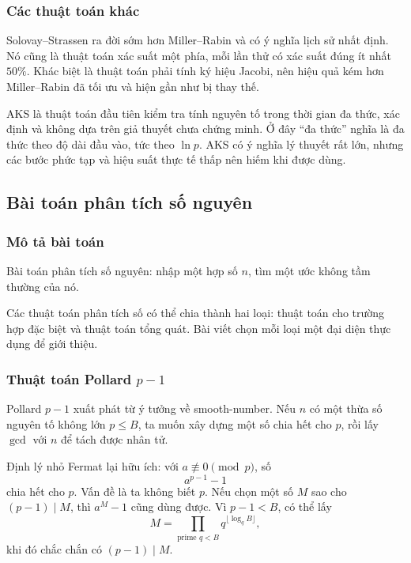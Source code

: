 \documentclass[11pt]{article}
\begin{document}
\subsubsection{Các thuật toán khác}

Solovay--Strassen ra đời sớm hơn Miller--Rabin và có ý nghĩa lịch sử nhất
định. Nó cũng là thuật toán xác suất một phía, mỗi lần thử có xác suất đúng ít
nhất \(50\%\). Khác biệt là thuật toán phải tính ký hiệu Jacobi, nên hiệu quả
kém hơn Miller--Rabin đã tối ưu và hiện gần như bị thay thế.

AKS là thuật toán đầu tiên kiểm tra tính nguyên tố trong thời gian đa thức, xác
định và không dựa trên giả thuyết chưa chứng minh. Ở đây ``đa thức'' nghĩa là
đa thức theo độ dài đầu vào, tức theo \(\ln p\). AKS có ý nghĩa lý thuyết rất
lớn, nhưng các bước phức tạp và hiệu suất thực tế thấp nên hiếm khi được dùng.

\subsection{Bài toán phân tích số nguyên}

\subsubsection{Mô tả bài toán}

Bài toán phân tích số nguyên: nhập một hợp số \(n\), tìm một ước không tầm
thường của nó.

Các thuật toán phân tích số có thể chia thành hai loại: thuật toán cho trường
hợp đặc biệt và thuật toán tổng quát. Bài viết chọn mỗi loại một đại diện thực
dụng để giới thiệu.

\subsubsection{\texorpdfstring{Thuật toán Pollard \(p-1\)}{Thuật toán Pollard p-1}}

Pollard \(p-1\) xuất phát từ ý tưởng về smooth-number. Nếu \(n\) có một thừa số
nguyên tố không lớn \(p\le B\), ta muốn xây dựng một số chia hết cho \(p\), rồi
lấy \(\gcd\) với \(n\) để tách được nhân tử.

Định lý nhỏ Fermat lại hữu ích: với \(a\not\equiv 0\pmod p\), số
\[
  a^{p-1}-1
\]
chia hết cho \(p\). Vấn đề là ta không biết \(p\). Nếu chọn một số \(M\) sao
cho \((p-1)\mid M\), thì \(a^M-1\) cũng dùng được. Vì \(p-1<B\), có thể lấy
\[
  M=\prod_{\text{prime }q<B} q^{\lfloor \log_q B\rfloor},
\]
khi đó chắc chắn có \((p-1)\mid M\).
\end{document}
